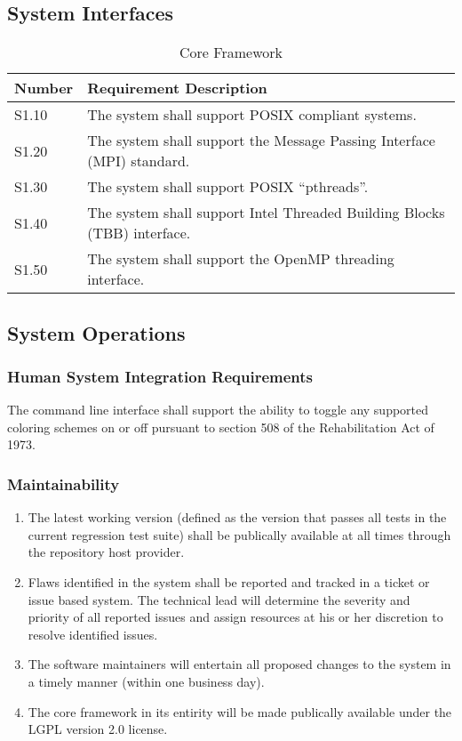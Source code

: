\documentclass{INLreport}
\begin{document}
\clearpage

\subsection{System Interfaces}

\begin{table}[!htbp]
  \caption{Core Framework\label{tab:perf_core}}
  \setcounter{SysFirstTableCounter}{1}
  \begin{tabular}{|l|p{12cm}|}
    \rowcolor{gray}
    Number & Requirement Description \\ \hline
    S1.10 & The system shall support POSIX compliant systems. \\ \hline
    S1.20 & The system shall support the Message Passing Interface (MPI) standard. \\ \hline
    S1.30 & The system shall support POSIX ``pthreads''. \\ \hline
    S1.40 & The system shall support Intel Threaded Building Blocks (TBB) interface. \\ \hline
    S1.50 & The system shall support the OpenMP threading interface. \\ \hline
  \end{tabular}
\end{table}

\clearpage

\subsection{System Operations}

\subsubsection{Human System Integration Requirements}
The command line interface shall support the ability to toggle any supported coloring schemes on or off pursuant to section 508 of the Rehabilitation Act of 1973.

\subsubsection{Maintainability}
\label{Maintainability}
\begin{enumerate}
\item The latest working version (defined as the version that passes all tests in the current regression test suite)
      shall be publically available at all times through the repository host provider.
\item Flaws identified in the system shall be reported and tracked in a ticket or issue based system. The technical lead
      will determine the severity and priority of all reported issues and assign resources at his or her discretion to
      resolve identified issues.
\item The software maintainers will entertain all proposed changes to the system in a timely manner (within one business day).
\item The core framework in its entirity will be made publically available under the LGPL version 2.0 license.
\end{enumerate}
\end{document}
